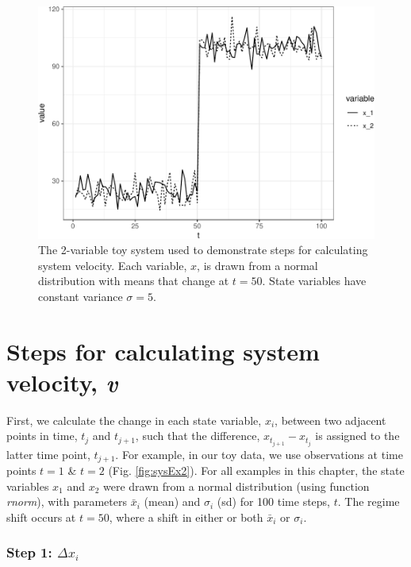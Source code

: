 \documentclass[12pt,twoside,openany]{reedthesis}
\begin{document}
\begin{figure}
\centering
\includegraphics{_myDissertation_files/figure-latex/sysEx-1.pdf}
\caption{\label{fig:sysEx}The 2-variable toy system used to demonstrate steps for calculating system velocity. Each variable, \(x\), is drawn from a normal distribution with means that change at \(t = 50\). State variables have constant variance \(\sigma = 5\).}
\end{figure}
\hypertarget{steps-for-calculating-system-velocity-v}{%
\section{\texorpdfstring{Steps for calculating system velocity, \emph{v}}{Steps for calculating system velocity, v}}\label{steps-for-calculating-system-velocity-v}}

First, we calculate the change in each state variable, \(x_i\), between two adjacent points in time, \(t_j\) and \(t_{j+1}\), such that the difference, \(x_{t_{j+1}} - x_{t_j}\) is assigned to the latter time point, \(t_{j+1}\). For example, in our toy data, we use observations at time points \(t = 1\) \& \(t=2\) (Fig. \ref{fig:sysEx2}). For all examples in this chapter, the state variables \(x_1\) and \(x_2\) were drawn from a normal distribution (using function \emph{rnorm}), with parameters \(\bar{x}_i\) (mean) and \(\sigma_i\) (sd) for 100 time steps, \(t\). The regime shift occurs at \(t=50\), where a shift in either or both \(\bar{x}_i\) or \(\sigma_i\).

\hypertarget{step-1-delta-x_i}{%
\subsubsection{\texorpdfstring{Step 1: \(\Delta x_i\)}{Step 1: \textbackslash{}Delta x\_i}}\label{step-1-delta-x_i}}
\end{document}
